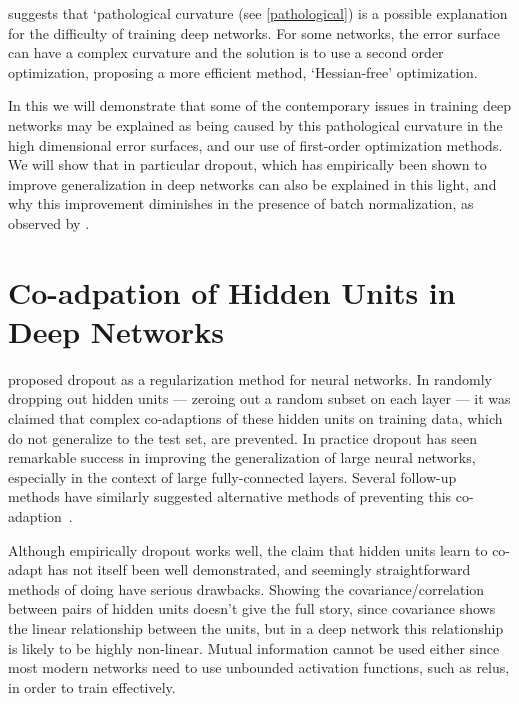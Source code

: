 \documentclass[thesis]{subfiles}
\begin{document}
\citet{martens2010deep} suggests that `pathological curvature (see \cref{pathological}) is a possible explanation for the difficulty of training deep networks. For some networks, the error surface can have a complex curvature  and the solution is to use a second order optimization, proposing a more efficient method, `Hessian-free' optimization.

In this  we will demonstrate that some of the contemporary issues in training deep networks may be explained as being caused by this pathological curvature in the high dimensional error surfaces, and our use of first-order optimization methods. We will show that in particular dropout, which has empirically been shown to improve generalization in deep networks can also be explained in this light, and why this improvement diminishes in the presence of batch normalization, as observed by \citet{Ioffe2015}.

\section{Co-adpation of Hidden Units in Deep Networks}
\citet{dropout,dropoutjmlr} proposed dropout as a regularization method for neural networks. In randomly dropping out hidden units --- zeroing out a random subset on each layer --- it was claimed that complex co-adaptions of these hidden units on training data, which do not generalize to the test set, are prevented. In practice dropout has seen remarkable success in improving the generalization of large neural networks, especially in the context of large fully-connected layers. Several follow-up methods have similarly suggested alternative methods of preventing this co-adaption~\citep{Cogswell2016}.

Although empirically dropout works well, the claim that hidden units learn to co-adapt has not itself been well demonstrated, and seemingly straightforward methods of doing have serious drawbacks. Showing the covariance/correlation between pairs of hidden units doesn't give the full story, since covariance shows the linear relationship between the units, but in a deep network this relationship is likely to be highly non-linear. Mutual information cannot be used either since most modern networks need to use unbounded activation functions, such as \glspl{relu}, in order to train effectively.
\end{document}
